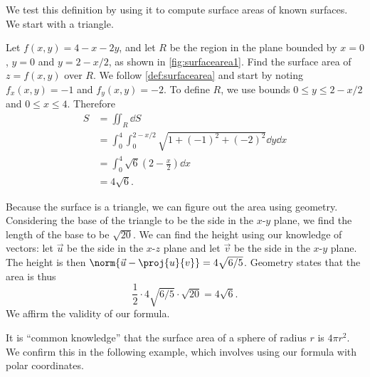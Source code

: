 
We test this definition by using it to compute surface areas of known surfaces. We start with a triangle.

\begin{example}\label{ex_surfacearea1}
Let $f(x,y) = 4-x-2y$, and let $R$ be the region in the plane bounded by $x=0$, $y=0$ and $y=2-x/2$, as shown in \autoref{fig:surfacearea1}. Find the surface area of $z=f(x,y)$ over $R$.
%
%
\solution
We follow \autoref{def:surfacearea} and start by noting $f_x(x,y) = -1$ and $f_y(x,y) = -2$. To define $R$, we use bounds $0\leq y\leq 2-x/2$ and $0\leq x\leq 4$. Therefore
\begin{align*}
S &= \iint_R\dd S \\
  &= \int_0^4\int_0^{2-x/2} \sqrt{1+(-1)^2+(-2)^2}\dd y\dd x\\
	&= \int_0^4 \sqrt{6}\left(2-\frac x2\right)\dd x\\
	&= 4\sqrt{6}.
\end{align*}

Because the surface is a triangle, we can figure out the area using geometry. Considering the base of the triangle to be the side in the $x$-$y$ plane, we find the length of the base to be $\sqrt{20}$. We can find the height using our knowledge of vectors: let $\vec u$ be the side in the $x$-$z$ plane  and let $\vec v$ be the side in the $x$-$y$ plane. The height is then $\norm {\vec u - \proj{u}{v}} = 4\sqrt{6/5}$. Geometry states that the area is thus
\[\frac 12\cdot4\sqrt{6/5}\cdot\sqrt{20} = 4\sqrt{6}.\]
We affirm the validity of our formula.
\end{example}

It is ``common knowledge'' that the surface area of a sphere of radius $r$ is $4\pi r^2$. We confirm this in the following example, which involves using our formula with polar coordinates.

